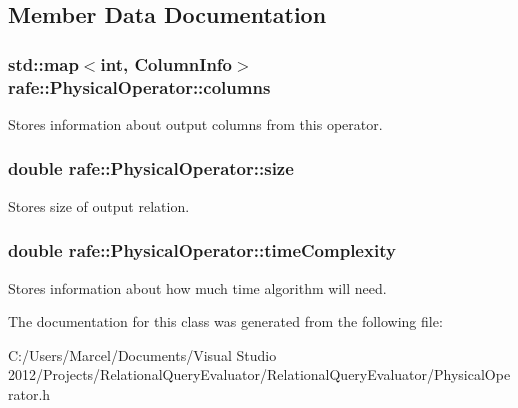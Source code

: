 \subsection{Member Data Documentation}
\hypertarget{classrafe_1_1_physical_operator_a4056113435af85657e5b61d397db5165}{
\subsubsection[{columns}]{\setlength{\rightskip}{0pt plus 5cm}std\+::map$<$int, {\bf Column\+Info}$>$ rafe\+::\+Physical\+Operator\+::columns}}\label{classrafe_1_1_physical_operator_a4056113435af85657e5b61d397db5165}
Stores information about output columns from this operator. \hypertarget{classrafe_1_1_physical_operator_a91df60e6935353504d02b9534a16eb4c}{
\subsubsection[{size}]{\setlength{\rightskip}{0pt plus 5cm}double rafe\+::\+Physical\+Operator\+::size}}\label{classrafe_1_1_physical_operator_a91df60e6935353504d02b9534a16eb4c}
Stores size of output relation. \hypertarget{classrafe_1_1_physical_operator_a7b1bec2ef31be7b9c85ab32f543e23af}{
\subsubsection[{time\+Complexity}]{\setlength{\rightskip}{0pt plus 5cm}double rafe\+::\+Physical\+Operator\+::time\+Complexity}}\label{classrafe_1_1_physical_operator_a7b1bec2ef31be7b9c85ab32f543e23af}
Stores information about how much time algorithm will need. 

The documentation for this class was generated from the following file\+:\begin{DoxyCompactItemize}
\item 
C\+:/\+Users/\+Marcel/\+Documents/\+Visual Studio 2012/\+Projects/\+Relational\+Query\+Evaluator/\+Relational\+Query\+Evaluator/Physical\+Operator.\+h\end{DoxyCompactItemize}
